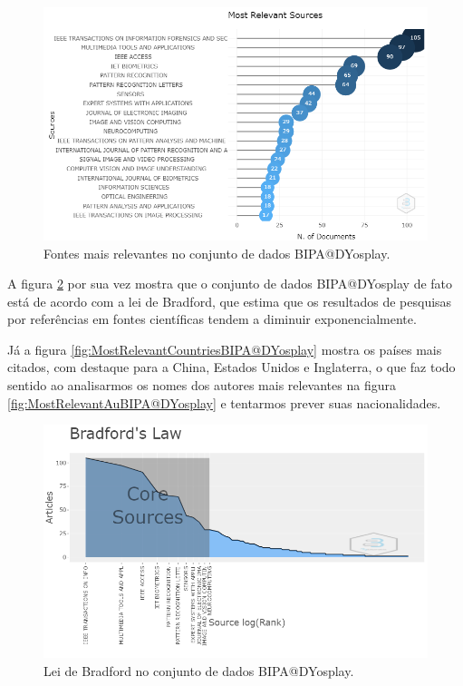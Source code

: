 \begin{figure}[H]
    \centering
    \includegraphics[width=1\textwidth]{experiments/DYosplay/PesquisaBibliometrica/Imagens/BIPA@DYosplay_MostRelevantSources.png}
    \caption{Fontes mais relevantes no conjunto de dados BIPA@DYosplay.}
    \label{fig:MostRelevantSourcesBIPA@DYosplay}
\end{figure}

A figura \ref{fig:BradfordLawBIPA@DYosplay} por sua vez mostra que o conjunto de dados BIPA@DYosplay de fato está de acordo com a lei de Bradford, que estima que os resultados de pesquisas por referências em fontes científicas tendem a diminuir exponencialmente.

Já a figura \ref{fig:MostRelevantCountriesBIPA@DYosplay} mostra os países mais citados, com destaque para a China, Estados Unidos e Inglaterra, o que faz todo sentido ao analisarmos os nomes dos autores mais relevantes na figura \ref{fig:MostRelevantAuBIPA@DYosplay} e tentarmos prever suas nacionalidades.

\begin{figure}[H]
    \centering
    \includegraphics[width=1\textwidth]{experiments/DYosplay/PesquisaBibliometrica/Imagens/BIPA@DYosplay_BradfordLaw.png}
    \caption{Lei de Bradford no conjunto de dados BIPA@DYosplay.}
    \label{fig:BradfordLawBIPA@DYosplay}
\end{figure}


